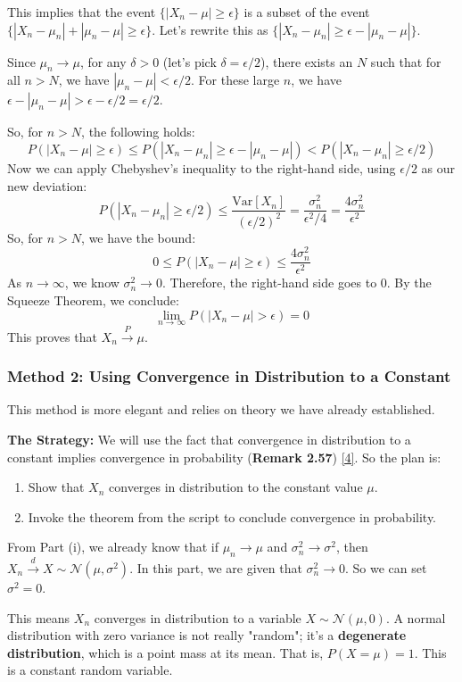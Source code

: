 \documentclass[11pt,a4paper]{article}
\begin{document}
This implies that the event $\{|X_n - \mu| \ge \epsilon\}$ is a subset of the event $\{|X_n - \mu_n| + |\mu_n - \mu| \ge \epsilon\}$. Let's rewrite this as $\{|X_n - \mu_n| \ge \epsilon - |\mu_n - \mu|\}$.

Since $\mu_n \to \mu$, for any $\delta > 0$ (let's pick $\delta = \epsilon/2$), there exists an $N$ such that for all $n > N$, we have $|\mu_n - \mu| < \epsilon/2$. For these large $n$, we have $\epsilon - |\mu_n - \mu| > \epsilon - \epsilon/2 = \epsilon/2$.

So, for $n > N$, the following holds:
\[ P(|X_n - \mu| \ge \epsilon) \le P(|X_n - \mu_n| \ge \epsilon - |\mu_n - \mu|) < P(|X_n - \mu_n| \ge \epsilon/2) \]
Now we can apply Chebyshev's inequality to the right-hand side, using $\epsilon/2$ as our new deviation:
\[ P(|X_n - \mu_n| \ge \epsilon/2) \le \frac{\text{Var}[X_n]}{(\epsilon/2)^2} = \frac{\sigma_n^2}{\epsilon^2/4} = \frac{4\sigma_n^2}{\epsilon^2} \]
So, for $n > N$, we have the bound:
\[ 0 \le P(|X_n - \mu| \ge \epsilon) \le \frac{4\sigma_n^2}{\epsilon^2} \]
As $n \to \infty$, we know $\sigma_n^2 \to 0$. Therefore, the right-hand side goes to 0. By the Squeeze Theorem, we conclude:
\[ \lim_{n \to \infty} P(|X_n - \mu| > \epsilon) = 0 \]
This proves that $X_n \stackrel{P}{\longrightarrow} \mu$.

\subsubsection*{Method 2: Using Convergence in Distribution to a Constant}
This method is more elegant and relies on theory we have already established.

\textbf{The Strategy:}
We will use the fact that convergence in distribution to a constant implies convergence in probability (\textbf{Remark 2.57}) \hyperlink{note4}{[4]}. So the plan is:
\begin{enumerate}
    \item Show that $X_n$ converges in distribution to the constant value $\mu$.
    \item Invoke the theorem from the script to conclude convergence in probability.
\end{enumerate}

From Part (i), we already know that if $\mu_n \to \mu$ and $\sigma_n^2 \to \sigma^2$, then $X_n \stackrel{d}{\longrightarrow} X \sim \mathcal{N}(\mu, \sigma^2)$. In this part, we are given that $\sigma_n^2 \to 0$. So we can set $\sigma^2 = 0$.

This means $X_n$ converges in distribution to a variable $X \sim \mathcal{N}(\mu, 0)$. A normal distribution with zero variance is not really "random"; it's a \textbf{degenerate distribution}, which is a point mass at its mean. That is, $P(X = \mu) = 1$. This is a constant random variable.
\end{document}
